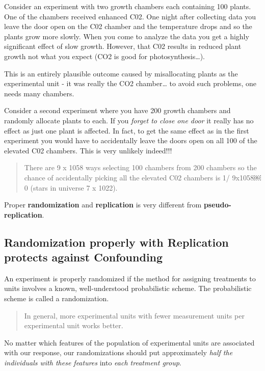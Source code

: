 \documentclass[
]{book}
\begin{document}
Consider an experiment with two growth chambers each containing 100 plants. One of the chambers received enhanced C02. One night after collecting data you leave the door open on the C02 chamber and the temperature drops and so the plants grow more slowly. When you come to analyze the data you get a highly significant effect of slow growth. However, that C02 results in reduced plant growth not what you expect (CO2 is good for photosynthesis\ldots).

This is an entirely plausible outcome caused by misallocating plants as the experimental unit - it was really the CO2 chamber\ldots{} to avoid such problems, one needs many chambers.

Consider a second experiment where you have 200 growth chambers and randomly allocate plants to each. If you \emph{forget to close one door} it really has no effect as just one plant is affected. In fact, to get the same effect as in the first experiment you would have to accidentally leave the doors open on all 100 of the elevated C02 chambers. This is very unlikely indeed!!!

\begin{quote}
There are 9 x 1058 ways selecting 100 chambers from 200 chambers so the chance of accidentally picking all the elevated C02 chambers is 1/ 9x1058￼0 (stars in universe 7 x 1022).
\end{quote}

Proper \textbf{randomization} and \textbf{replication} is very different from \textbf{pseudo-replication}.

\hypertarget{randomization-properly-with-replication-protects-against-confounding}{%
\subsection{Randomization properly with Replication protects against Confounding}\label{randomization-properly-with-replication-protects-against-confounding}}

An experiment is properly randomized if the method for assigning treatments to units involves a known, well-understood probabilistic scheme. The probabilistic scheme is called a randomization.

\begin{quote}
In general, more experimental units with fewer measurement units per experimental unit works better.
\end{quote}

No matter which features of the population of experimental units are associated with our response, our randomizations should put approximately \emph{half the individuals with these features} into \emph{each treatment group}.
\end{document}
